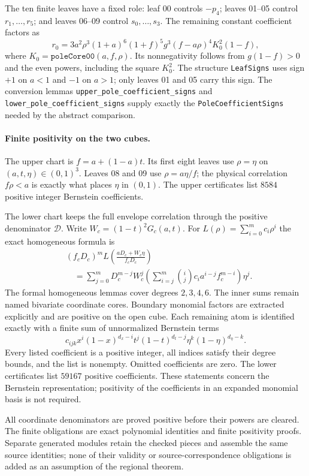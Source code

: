 The ten finite leaves have a fixed role: leaf 00 controls $-p_4$;
leaves 01--05 control $r_1,\ldots,r_5$; and leaves 06--09 control
$s_0,\ldots,s_3$. The remaining constant coefficient factors as
\[
 r_0=
 3a^2\rho^3(1+a)^6(1+f)^5g^3(f-a\rho)^4K_0^2(1-f),
\]
where $K_0=\texttt{poleCore00}(a,f,\rho)$. Its nonnegativity follows
from $g(1-f)>0$ and the even powers, including the square $K_0^2$.
The structure \texttt{LeafSigns} uses sign $+1$ on $a<1$ and $-1$
on $a>1$; only leaves 01 and 05 carry this sign. The conversion lemmas
\texttt{upper\_pole\_coefficient\_signs} and
\texttt{lower\_pole\_coefficient\_signs} supply exactly the
\texttt{PoleCoefficientSigns} needed by the abstract comparison.

\paragraph{Finite positivity on the two cubes.}
The upper chart is $f=a+(1-a)t$. Its first eight leaves use
$\rho=\eta$ on $(a,t,\eta)\in(0,1)^3$.
Leaves 08 and 09 use $\rho=a\eta/f$; the physical correlation
$f\rho<a$ is exactly what places $\eta$ in $(0,1)$.
The upper certificates list $8584$ positive integer Bernstein
coefficients.

The lower chart keeps the full envelope correlation through the
positive denominator $\mathcal D$. Write $W_c=(1-t)^2G_c(a,t)$.
For $L(\rho)=\sum_{i=0}^m c_i\rho^i$ the exact homogeneous formula is
\[
 \begin{split}
 &(f_cD_c)^m
 L\left(\frac{aD_c+W_c\eta}{f_cD_c}\right)\\
 &\quad=
 \sum_{j=0}^mD_c^{m-j}W_c^j
       \left(\sum_{i=j}^m\binom ij c_i a^{i-j}f_c^{m-i}\right)\eta^j.
 \end{split}
\]
The formal homogeneous lemmas cover degrees $2,3,4,6$.
The inner sums remain named bivariate coordinate cores.
Boundary monomial factors are extracted explicitly and are positive
on the open cube. Each remaining atom is identified exactly with a
finite sum of unnormalized Bernstein terms
\[
 c_{ijk}x^i(1-x)^{d_x-i}
         t^j(1-t)^{d_t-j}
         \eta^k(1-\eta)^{d_\eta-k}.
\]
Every listed coefficient is a positive integer, all indices satisfy
their degree bounds, and the list is nonempty. Omitted coefficients
are zero. The lower certificates list $59167$ positive coefficients.
These statements concern the Bernstein representation; positivity
of the coefficients in an expanded monomial basis is not required.

All coordinate denominators are proved positive before their powers
are cleared. The finite obligations are exact polynomial identities
and finite positivity proofs. Separate generated modules retain the
checked pieces and assemble the same source identities; none of
their validity or source-correspondence obligations is added as an
assumption of the regional theorem.

